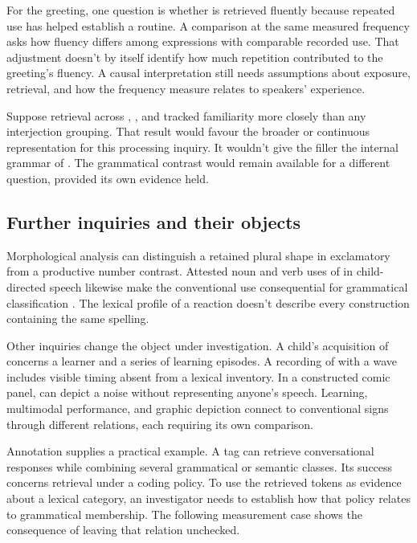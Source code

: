 \documentclass[12pt]{article}
\begin{document}
For the greeting, one question is whether  is
retrieved fluently because repeated use has helped establish a routine.
A comparison at the same measured frequency asks how fluency differs
among expressions with comparable recorded use. That adjustment doesn't
by itself identify how much repetition contributed to the greeting's
fluency. A causal interpretation still needs assumptions about exposure,
retrieval, and how the frequency measure relates to speakers' experience.

Suppose retrieval across , , and
 tracked familiarity more closely than any
interjection grouping. That result would favour the broader or continuous
representation for this processing inquiry. It wouldn't give the filler
 the internal grammar of . The
grammatical contrast would remain available for a different question,
provided its own evidence held.

\subsection{Further inquiries and their objects}

Morphological analysis can distinguish a retained plural shape in
exclamatory  from a productive number contrast. Attested
noun and verb uses of  in child-directed speech likewise
make the conventional use consequential for grammatical classification
\citep[36]{stange2016}. The lexical profile of a reaction doesn't describe
every construction containing the same spelling.

Other inquiries change the object under investigation. A child's acquisition
of  concerns a learner and a series of learning episodes.
A recording of  with a wave includes visible timing absent
from a lexical inventory. In a constructed comic panel, 
can depict a noise without representing anyone's speech. Learning,
multimodal performance, and graphic depiction connect to conventional signs
through different relations, each requiring its own comparison.

Annotation supplies a practical example. A tag can retrieve conversational
responses while combining several grammatical or semantic classes. Its
success concerns retrieval under a coding policy. To use the retrieved
tokens as evidence about a lexical category, an investigator needs
to establish how that policy relates to grammatical membership. The
following measurement case shows the consequence of leaving that relation
unchecked.
\end{document}

